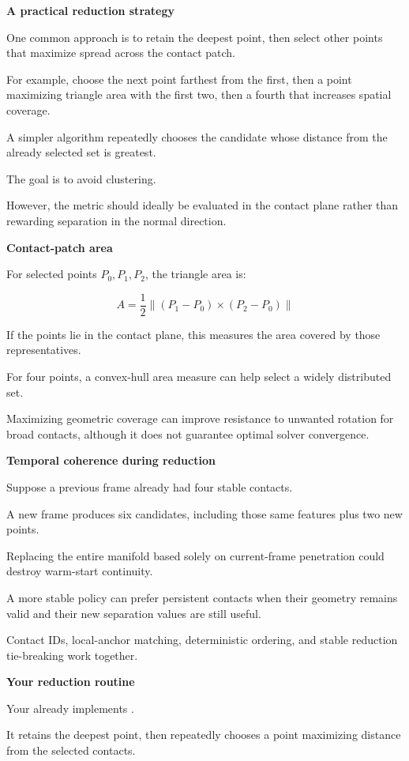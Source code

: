 \textbf{A practical reduction strategy}

One common approach is to retain the deepest point, then select other points that maximize spread across the contact patch.

For example, choose the next point farthest from the first, then a point maximizing triangle area with the first two, then a fourth that increases spatial coverage.

A simpler algorithm repeatedly chooses the candidate whose distance from the already selected set is greatest.

The goal is to avoid clustering.

However, the metric should ideally be evaluated in the contact plane rather than rewarding separation in the normal direction.

\textbf{Contact-patch area}

For selected points \(P_0,P_1,P_2\), the triangle area is:

\[
\boxed{ A=\frac12 \|(P_1-P_0)\times(P_2-P_0)\| }
\]

If the points lie in the contact plane, this measures the area covered by those representatives.

For four points, a convex-hull area measure can help select a widely distributed set.

Maximizing geometric coverage can improve resistance to unwanted rotation for broad contacts, although it does not guarantee optimal solver convergence.

\textbf{Temporal coherence during reduction}

Suppose a previous frame already had four stable contacts.

A new frame produces six candidates, including those same features plus two new points.

Replacing the entire manifold based solely on current-frame penetration could destroy warm-start continuity.

A more stable policy can prefer persistent contacts when their geometry remains valid and their new separation values are still useful.

Contact IDs, local-anchor matching, deterministic ordering, and stable reduction tie-breaking work together.

\textbf{Your reduction routine}

Your  already implements .

It retains the deepest point, then repeatedly chooses a point maximizing distance from the selected contacts.

